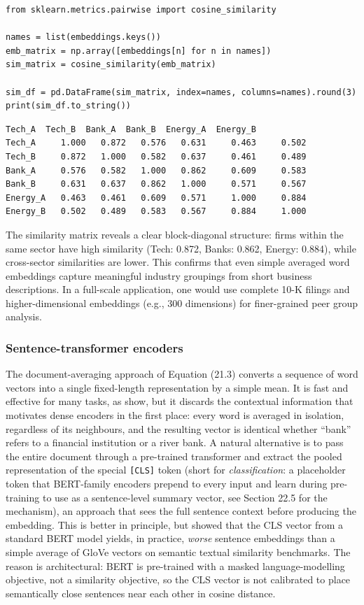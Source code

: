 \begin{verbatim}
from sklearn.metrics.pairwise import cosine_similarity

names = list(embeddings.keys())
emb_matrix = np.array([embeddings[n] for n in names])
sim_matrix = cosine_similarity(emb_matrix)

sim_df = pd.DataFrame(sim_matrix, index=names, columns=names).round(3)
print(sim_df.to_string())
\end{verbatim}

\begin{verbatim}
Tech_A  Tech_B  Bank_A  Bank_B  Energy_A  Energy_B
Tech_A     1.000   0.872   0.576   0.631     0.463     0.502
Tech_B     0.872   1.000   0.582   0.637     0.461     0.489
Bank_A     0.576   0.582   1.000   0.862     0.609     0.583
Bank_B     0.631   0.637   0.862   1.000     0.571     0.567
Energy_A   0.463   0.461   0.609   0.571     1.000     0.884
Energy_B   0.502   0.489   0.583   0.567     0.884     1.000
\end{verbatim}

The similarity matrix reveals a clear block-diagonal structure: firms within the same sector have high similarity (Tech: 0.872, Banks: 0.862, Energy: 0.884), while cross-sector similarities are lower. This confirms that even simple averaged word embeddings capture meaningful industry groupings from short business descriptions. In a full-scale application, one would use complete 10-K filings and higher-dimensional embeddings (e.g., 300 dimensions) for finer-grained peer group analysis.

\subsubsection{Sentence-transformer encoders}

The document-averaging approach of Equation (21.3) converts a sequence of word vectors into a single fixed-length representation by a simple mean. It is fast and effective for many tasks, as \cite{wieting2016towards} show, but it discards the contextual information that motivates dense encoders in the first place: every word is averaged in isolation, regardless of its neighbours, and the resulting vector is identical whether ``bank'' refers to a financial institution or a river bank. A natural alternative is to pass the entire document through a pre-trained transformer and extract the pooled representation of the special \texttt{[CLS]} token (short for \textit{classification}: a placeholder token that BERT-family encoders prepend to every input and learn during pre-training to use as a sentence-level summary vector, see Section 22.5 for the mechanism), an approach that sees the full sentence context before producing the embedding. This is better in principle, but \cite{reimers2019sbert} showed that the CLS vector from a standard BERT model yields, in practice, \textit{worse} sentence embeddings than a simple average of GloVe vectors on semantic textual similarity benchmarks. The reason is architectural: BERT is pre-trained with a masked language-modelling objective, not a similarity objective, so the CLS vector is not calibrated to place semantically close sentences near each other in cosine distance.

